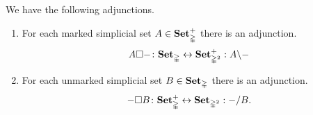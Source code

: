 \documentclass[main.tex]{subfiles}
\begin{document}
\begin{proposition}
  We have the following adjunctions.

  \begin{enumerate}
    \item For each marked simplicial set $A \in \mathbf{Set}_{\mathbb{\Delta}}^{+}$ there is an adjunction.
      \begin{equation*}
        A \square -\colon \mathbf{Set}_{\mathbb{\Delta}} \leftrightarrow \mathbf{Set}_{\mathbb{\Delta}^{2}}^{+} : A \backslash -
      \end{equation*}

    \item For each unmarked simplicial set $B \in \mathbf{Set}_{\mathbb{\Delta}}$ there is an adjunction.
      \begin{equation*}
        - \square B\colon \mathbf{Set}_{\mathbb{\Delta}}^{+} \leftrightarrow \mathbf{Set}_{\mathbb{\Delta}^{2}} : - / B.
      \end{equation*}
  \end{enumerate}
\end{proposition}
\end{document}

